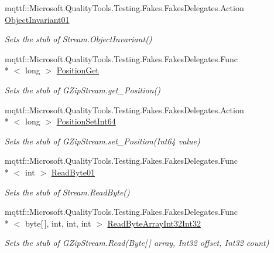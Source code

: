 \begin{DoxyCompactItemize}
mqttf\-::\-Microsoft.\-Quality\-Tools.\-Testing.\-Fakes.\-Fakes\-Delegates.\-Action \hyperlink{class_system_1_1_i_o_1_1_compression_1_1_fakes_1_1_stub_g_zip_stream_ae6a0498cdbe10dab78d4a61fe43d0e63}{Object\-Invariant01}
\begin{DoxyCompactList}\small\item\em Sets the stub of Stream.\-Object\-Invariant()\end{DoxyCompactList}\item 
mqttf\-::\-Microsoft.\-Quality\-Tools.\-Testing.\-Fakes.\-Fakes\-Delegates.\-Func\\*
$<$ long $>$ \hyperlink{class_system_1_1_i_o_1_1_compression_1_1_fakes_1_1_stub_g_zip_stream_aa9e7a98e5f46e00297c720aded0a919a}{Position\-Get}
\begin{DoxyCompactList}\small\item\em Sets the stub of G\-Zip\-Stream.\-get\-\_\-\-Position()\end{DoxyCompactList}\item 
mqttf\-::\-Microsoft.\-Quality\-Tools.\-Testing.\-Fakes.\-Fakes\-Delegates.\-Action\\*
$<$ long $>$ \hyperlink{class_system_1_1_i_o_1_1_compression_1_1_fakes_1_1_stub_g_zip_stream_a4311b2ef50485c3f8185dc998ee04986}{Position\-Set\-Int64}
\begin{DoxyCompactList}\small\item\em Sets the stub of G\-Zip\-Stream.\-set\-\_\-\-Position(\-Int64 value)\end{DoxyCompactList}\item 
mqttf\-::\-Microsoft.\-Quality\-Tools.\-Testing.\-Fakes.\-Fakes\-Delegates.\-Func\\*
$<$ int $>$ \hyperlink{class_system_1_1_i_o_1_1_compression_1_1_fakes_1_1_stub_g_zip_stream_a43cbd7617528127c7de774fefec33863}{Read\-Byte01}
\begin{DoxyCompactList}\small\item\em Sets the stub of Stream.\-Read\-Byte()\end{DoxyCompactList}\item 
mqttf\-::\-Microsoft.\-Quality\-Tools.\-Testing.\-Fakes.\-Fakes\-Delegates.\-Func\\*
$<$ byte\mbox{[}$\,$\mbox{]}, int, int, int $>$ \hyperlink{class_system_1_1_i_o_1_1_compression_1_1_fakes_1_1_stub_g_zip_stream_ace1b6bcbfef44f85f86132abb325a1ae}{Read\-Byte\-Array\-Int32\-Int32}
\begin{DoxyCompactList}\small\item\em Sets the stub of G\-Zip\-Stream.\-Read(\-Byte\mbox{[}$\,$\mbox{]} array, Int32 offset, Int32 count)\end{DoxyCompactList}\item 

\end{DoxyCompactItemize}
